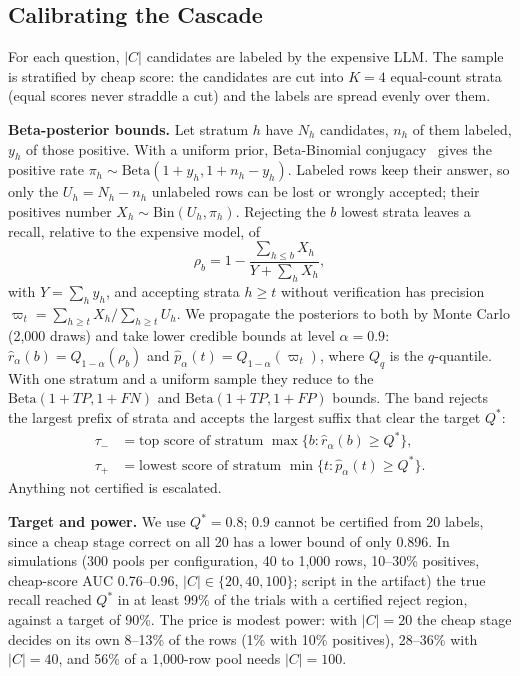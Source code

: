 \documentclass[sigconf]{acmart}
\begin{document}
\subsection{Calibrating the Cascade}
\label{sec:cascade-math}
For each question, $|C|$ candidates are labeled by the expensive LLM. The sample is stratified by cheap score: the candidates are cut into $K{=}4$ equal-count strata (equal scores never straddle a cut) and the labels are spread evenly over them.

\textbf{Beta-posterior bounds.} Let stratum $h$ have $N_h$ candidates, $n_h$ of them labeled, $y_h$ of those positive. With a uniform prior, Beta-Binomial conjugacy~\cite{gelman2013bayesian} gives the positive rate $\pi_h\sim\mathrm{Beta}(1{+}y_h,1{+}n_h{-}y_h)$. Labeled rows keep their answer, so only the $U_h=N_h-n_h$ unlabeled rows can be lost or wrongly accepted; their positives number $X_h\sim\mathrm{Bin}(U_h,\pi_h)$. Rejecting the $b$ lowest strata leaves a recall, relative to the expensive model, of
\[ \rho_b = 1-\frac{\sum_{h\le b}X_h}{Y+\sum_h X_h}, \]
with $Y=\sum_h y_h$, and accepting strata $h\ge t$ without verification has precision $\varpi_t=\sum_{h\ge t}X_h/\sum_{h\ge t}U_h$. We propagate the posteriors to both by Monte Carlo (2,000 draws) and take lower credible bounds at level $\alpha{=}0.9$: $\widehat r_\alpha(b)=Q_{1-\alpha}(\rho_b)$ and $\widehat p_\alpha(t)=Q_{1-\alpha}(\varpi_t)$, where $Q_q$ is the $q$-quantile. With one stratum and a uniform sample they reduce to the $\mathrm{Beta}(1{+}\mathit{TP},1{+}\mathit{FN})$ and $\mathrm{Beta}(1{+}\mathit{TP},1{+}\mathit{FP})$ bounds. The band rejects the largest prefix of strata and accepts the largest suffix that clear the target $Q^\ast$:
\begin{align*}
\tau_- &= \text{top score of stratum }\max\{b:\widehat r_\alpha(b)\ge Q^\ast\},\\
\tau_+ &= \text{lowest score of stratum }\min\{t:\widehat p_\alpha(t)\ge Q^\ast\}.
\end{align*}
Anything not certified is escalated.

\textbf{Target and power.} We use $Q^\ast{=}0.8$; $0.9$ cannot be certified from 20 labels, since a cheap stage correct on all 20 has a lower bound of only 0.896. In simulations (300 pools per configuration, 40 to 1,000 rows, 10--30\% positives, cheap-score AUC 0.76--0.96, $|C|\in\{20,40,100\}$; script in the artifact) the true recall reached $Q^\ast$ in at least 99\% of the trials with a certified reject region, against a target of 90\%. The price is modest power: with $|C|=20$ the cheap stage decides on its own 8--13\% of the rows (1\% with 10\% positives), 28--36\% with $|C|=40$, and 56\% of a 1,000-row pool needs $|C|=100$.
\end{document}
